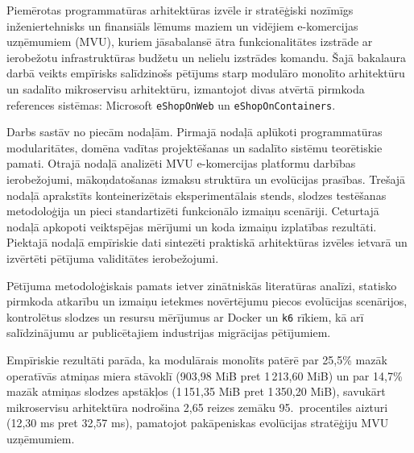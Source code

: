 \frontmatterpage
{}

Piemērotas programmatūras arhitektūras izvēle ir stratēģiski nozīmīgs inženiertehnisks un finansiāls lēmums maziem un vidējiem e-komercijas uzņēmumiem (MVU), kuriem jāsabalansē ātra funkcionalitātes izstrāde ar ierobežotu infrastruktūras budžetu un nelielu izstrādes komandu. Šajā bakalaura darbā veikts empīrisks salīdzinošs pētījums starp modulāro monolīto arhitektūru un sadalīto mikroservisu arhitektūru, izmantojot divas atvērtā pirmkoda references sistēmas: Microsoft \texttt{eShopOnWeb} un \texttt{eShopOnContainers}.

Darbs sastāv no piecām nodaļām. Pirmajā nodaļā aplūkoti programmatūras modularitātes, domēna vadītas projektēšanas un sadalīto sistēmu teorētiskie pamati. Otrajā nodaļā analizēti MVU e-komercijas platformu darbības ierobežojumi, mākoņdatošanas izmaksu struktūra un evolūcijas prasības. Trešajā nodaļā aprakstīts konteinerizētais eksperimentālais stends, slodzes testēšanas metodoloģija un pieci standartizēti funkcionālo izmaiņu scenāriji. Ceturtajā nodaļā apkopoti veiktspējas mērījumi un koda izmaiņu izplatības rezultāti. Piektajā nodaļā empīriskie dati sintezēti praktiskā arhitektūras izvēles ietvarā un izvērtēti pētījuma validitātes ierobežojumi.

Pētījuma metodoloģiskais pamats ietver zinātniskās literatūras analīzi, statisko pirmkoda atkarību un izmaiņu ietekmes novērtējumu piecos evolūcijas scenārijos, kontrolētus slodzes un resursu mērījumus ar Docker un \texttt{k6} rīkiem, kā arī salīdzinājumu ar publicētajiem industrijas migrācijas pētījumiem.

Empīriskie rezultāti parāda, ka modulārais monolīts patērē par 25,5\% mazāk operatīvās atmiņas miera stāvoklī (903,98 MiB pret 1\,213,60 MiB) un par 14,7\% mazāk atmiņas slodzes apstākļos (1\,151,35 MiB pret 1\,350,20 MiB), savukārt mikroservisu arhitektūra nodrošina 2,65 reizes zemāku 95.\ procentiles aizturi (12,30 ms pret 32,57 ms), pamatojot pakāpeniskas evolūcijas stratēģiju MVU uzņēmumiem.

\thesisscopeLV
